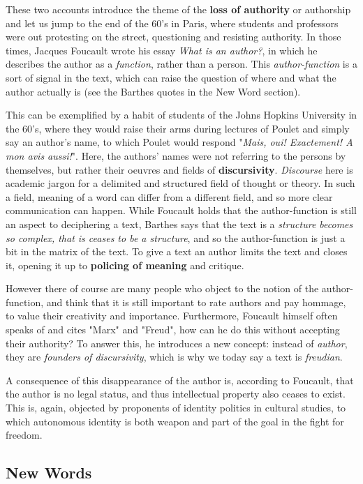 \documentclass[]{scrartcl}
\begin{document}
These two accounts introduce the theme of the \textbf{loss of authority} or authorship and let us jump to the end of the 60's in Paris, where students and professors were out protesting on the street, questioning and resisting authority. In those times, Jacques Foucault wrote his essay \emph{What is an author?}, in which he describes the author as a \emph{function}, rather than a person. This \emph{author-function} is a sort of signal in the text, which can raise the question of where and what the author actually is (see the Barthes quotes in the New Word section). 

This can be exemplified by a habit of students of the Johns Hopkins University in the 60's, where they would raise their arms during lectures of Poulet and simply say an author's name, to which Poulet would respond "\emph{Mais, oui! Exactement! A mon avis aussi!}". Here, the authors' names were not referring to the persons by themselves, but rather their oeuvres and fields of \textbf{discursivity}. \emph{Discourse} here is academic jargon for a delimited and structured field of thought or theory. In such a field, meaning of a word can differ from a different field, and so more clear communication can happen. While Foucault holds that the author-function is still an aspect to deciphering a text, Barthes says that the text is a \emph{structure becomes so complex, that is ceases to be a structure}, and so the author-function is just a bit in the matrix of the text. To give a text an author limits the text and closes it, opening it up to \textbf{policing of meaning} and critique.

However there of course are many people who object to the notion of the author-function, and think that it is still important to rate authors and pay hommage, to value their creativity and importance. Furthermore, Foucault himself often speaks of and cites "Marx" and "Freud", how can he do this without accepting their authority? To answer this, he introduces a new concept: instead of \emph{author}, they are \emph{founders of discursivity}, which is why we today say a text is \emph{freudian}.

A consequence of this disappearance of the author is, according to Foucault, that the author is no legal status, and thus intellectual property also ceases to exist. This is, again, objected by proponents of identity politics in cultural studies, to which autonomous identity is both weapon and part of the goal in the fight for freedom.

\subsection{New Words}
\end{document}
